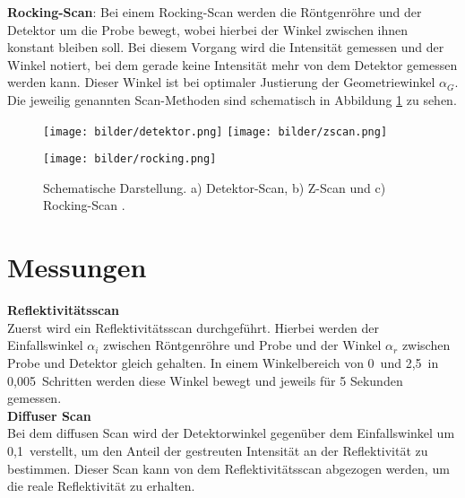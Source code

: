 \textbf{Rocking-Scan}:
Bei einem Rocking-Scan werden die Röntgenröhre und der Detektor um die Probe bewegt, wobei hierbei der Winkel zwischen ihnen konstant bleiben soll. Bei diesem Vorgang wird die Intensität gemessen und der Winkel notiert, bei dem gerade keine Intensität mehr von dem Detektor gemessen werden kann. Dieser Winkel ist bei optimaler Justierung der Geometriewinkel $\alpha_G$.\\

Die jeweilig genannten Scan-Methoden sind schematisch in Abbildung \ref{scan} zu sehen.

\begin{figure}[htbp]
\begin{minipage}[c]{0.45\textwidth}
\texttt{[image: bilder/detektor.png]}
\texttt{[image: bilder/zscan.png]}
\end{minipage}
\begin{minipage}[c]{0.45\textwidth}
\texttt{[image: bilder/rocking.png]}
\end{minipage}
\caption{Schematische Darstellung. a) Detektor-Scan, b) Z-Scan und c) Rocking-Scan \cite{anleitung}.}
\label{scan}
\end{figure}

\section{Messungen}
\textbf{Reflektivitätsscan}\\
Zuerst wird ein Reflektivitätsscan durchgeführt. Hierbei werden der Einfallswinkel $\alpha_i$ zwischen Röntgenröhre und Probe und der Winkel $\alpha_r$ zwischen Probe und Detektor gleich gehalten. In einem Winkelbereich von 0\textdegree\, und 2,5\textdegree\, in 0,005\textdegree\, Schritten werden diese Winkel bewegt und jeweils für 5 Sekunden gemessen.\\

\textbf{Diffuser Scan}\\
Bei dem diffusen Scan wird der Detektorwinkel gegenüber dem Einfallswinkel um 0,1\textdegree\, verstellt, um den Anteil der gestreuten Intensität an der Reflektivität zu bestimmen. Dieser Scan kann von dem Reflektivitätsscan abgezogen werden, um die reale Reflektivität zu erhalten.
